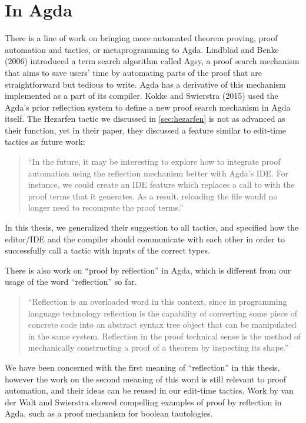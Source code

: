\section{In Agda}

There is a line of work on bringing more automated theorem proving,
proof automation and tactics, or metaprogramming to Agda.
Lindblad and Benke (2006) introduced a term search algorithm called
Agsy, a proof search mechanism that aims to save users' time by automating
parts of the proof that are straightforward but tedious to write.\cite{agsy}
Agda has a derivative of this mechanism implemented as a part of its compiler.
Kokke and Swierstra (2015) used the Agda's prior reflection system to define a
new proof search mechanism in Agda itself.\cite{autoinagda}
The Hezarfen tactic we discussed in \autoref{sec:hezarfen} is not as advanced
as their  function, yet in their paper, they discussed a feature
similar to edit-time tactics as future work:

\begin{quote}
  ``In the future, it may be interesting to explore how to integrate proof
  automation using the reflection mechanism better with Agda's IDE. For
  instance, we could create an IDE feature which replaces a call to
   with the proof terms that it generates. As a result, reloading
  the file would no longer need to recompute the proof terms.''\cite{autoinagda}
\end{quote}

In this thesis, we generalized their suggestion to all tactics, and specified
how the editor/IDE and the compiler should communicate with each other
in order to successfully call a tactic with inputs of the correct types.

There is also work on ``proof by reflection'' in Agda, which is different from our
usage of the word ``reflection'' so far.

\begin{quote}\label{quote:reflection}
``Reflection is an overloaded word in this context, since in programming language
  technology reflection is the capability of converting some piece of concrete
  code into an abstract syntax tree object that can be manipulated in the same
  system. Reflection in the proof technical sense is the method of mechanically
  constructing a proof of a theorem by inspecting its shape.''\cite{reflInAgda}
\end{quote}

We have been concerned with the first meaning of ``reflection'' in this thesis,
however the work on the second meaning of this word is still relevant to proof
automation, and their ideas can be reused in our edit-time tactics. Work by van
der Walt and Swierstra showed compelling examples of proof by reflection in
Agda, such as a proof mechanism for boolean tautologies.\cite{pfByReflAgda}

